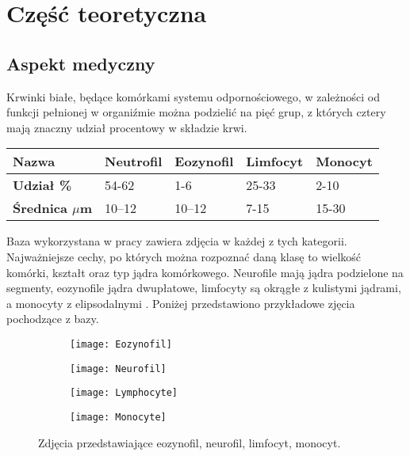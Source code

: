 \chapter{Część teoretyczna}
\label{cha:teoria}

\section{Aspekt medyczny}
Krwinki białe, będące komórkami systemu odpornościowego, w zależności od funkcji pełnionej w organiźmie można podzielić na pięć grup, z których cztery mają znaczny udział procentowy w składzie krwi.
\begin{table}[h]
\centering
\begin{tabular}{|l|l|l|l|l|}
\hline
\textbf{Nazwa}                               & Neutrofil & Eozynofil & Limfocyt & Monocyt \\ \hline
\textbf{Udział \%}\cite{lymphocytes_percentage} & 54-62   & 1-6    & 25-33  & 2-10  \\ \hline
\textbf{Średnica  \textbf{$\mu$}m}\cite{Wheater1979FunctionalHA} & 10–12  & 10–12 & 7-15  & 15-30  \\ \hline
\end{tabular}
\end{table}

Baza wykorzystana w pracy zawiera zdjęcia w każdej z tych kategorii. Najważniejsze cechy, po których można rozpoznać daną klasę to wielkość komórki, kształt oraz typ jądra komórkowego. Neurofile mają jądra podzielone na segmenty, eozynofile jądra dwupłatowe, limfocyty są okrągłe z kulistymi jądrami, a monocyty z elipsodalnymi \cite{lymphocytes_nucleus}. Poniżej przedstawiono przykładowe zjęcia pochodzące z bazy.

\begin{figure}[h]
	\centering
	\begin{subfigure}{0.35\textwidth}
		\centering
		\texttt{[image: Eozynofil]}
		\subcaption{\label{subfigure_a}}
	\end{subfigure}
	\begin{subfigure}{0.35\textwidth}
		\centering
		\texttt{[image: Neurofil]}
		\subcaption{\label{subfigure_b}}
	\end{subfigure}
	\begin{subfigure}{0.35\textwidth}
		\centering
		\texttt{[image: Lymphocyte]}
		\subcaption{\label{subfigure_c}}
	\end{subfigure}
	\begin{subfigure}{0.35\textwidth}
		\centering
		\texttt{[image: Monocyte]}
		\subcaption{\label{subfigure_d}}
	\end{subfigure}
	
	\caption{\label{fig:subcaption_example}Zdjęcia przedstawiające \protect{} eozynofil, \protect{} neurofil,  \protect{} limfocyt,  \protect{} monocyt.}
\end{figure}

